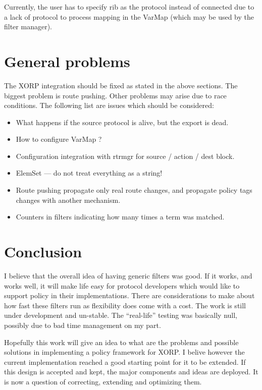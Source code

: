 \documentclass{article}
\begin{document}
Currently, the user has to specify rib as the protocol instead of connected due
to a lack of protocol to process mapping in the VarMap (which may be used by the
filter manager).


\section{General problems}
The XORP integration should be fixed as stated in the above sections. The
biggest problem is route pushing. Other problems may arise due to race
conditions. The following list are issues which should be considered:
\begin{itemize}
\item What happens if the source protocol is alive, but the export is dead.
\item How to configure VarMap ?
\item Configuration integration with rtrmgr for source / action / dest block.
\item ElemSet --- do not treat everything as a string!
\item Route pushing propagate only real route changes, and propagate policy tags
changes with another mechanism.
\item Counters in filters indicating how many times a term was matched.
\end{itemize}


\section{Conclusion}
I believe that the overall idea of having generic filters was good. If it works,
and works well, it will make life easy for protocol developers which would
like to support policy in their implementations. There are considerations to
make about how fast these filters run as flexibility does come with a
cost. The work is still under development and un-stable. The ``real-life''
testing was basically null, possibly due to bad time management on my part.

Hopefully this work will give an idea to what are the problems and possible
solutions in implementing a policy framework for XORP. I belive however the
current implementation reached a good starting point for it to be extended. If
this design is accepted and kept, the major components and ideas are deployed.
It is now a question of correcting, extending and optimizing them.
\end{document}
